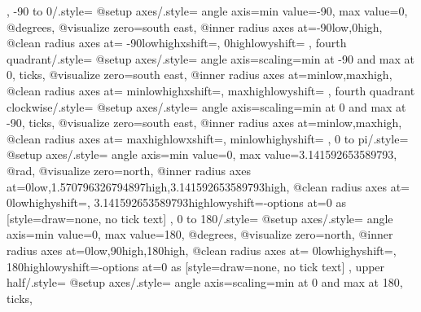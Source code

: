 {{{{      }
    }
  },
  -90 to 0/.style={
    @setup axes/.style={
      angle axis={min value=-90, max value=0},
      @degrees,
      @visualize zero=south east,
      @inner radius axes at={{-90}{low},{0}{high}},
      @clean radius axes at={%
        {-90}{low}{high}{xshift=}{},%
        {0}{high}{low}{yshift=}{}
      }
    }
  },
  fourth quadrant/.style={
    @setup axes/.style={
      angle axis={scaling=min at -90 and max at 0, ticks},
      @visualize zero=south east,
      @inner radius axes at={{min}{low},{max}{high}},
      @clean radius axes at={%
        {min}{low}{high}{xshift=}{},%
        {max}{high}{low}{yshift=}{}
      }
    }
  },
  fourth quadrant clockwise/.style={
    @setup axes/.style={
      angle axis={scaling=min at 0 and max at -90, ticks},
      @visualize zero=south east,
      @inner radius axes at={{min}{low},{max}{high}},
      @clean radius axes at={%
        {max}{high}{low}{xshift=}{},%
        {min}{low}{high}{yshift=}{}
      }
    }
  },
  0 to pi/.style={
    @setup axes/.style={
      angle axis={min value=0, max value=3.141592653589793},
      @rad,
      @visualize zero=north,
      @inner radius axes at={{0}{low},{1.570796326794897}{high},{3.141592653589793}{high}},
      @clean radius axes at={%
        {0}{low}{high}{yshift=}{},%
        {3.141592653589793}{high}{low}{yshift=-}{options at=0 as
          [{style={draw=none}, no tick text}]}
      }
    }
  },
  0 to 180/.style={
    @setup axes/.style={
      angle axis={min value=0, max value=180},
      @degrees,
      @visualize zero=north,
      @inner radius axes at={{0}{low},{90}{high},{180}{high}},
      @clean radius axes at={%
        {0}{low}{high}{yshift=}{},%
        {180}{high}{low}{yshift=-}{options at=0 as
          [{style={draw=none}, no tick text}]}
      }
    }
  },
  upper half/.style={
    @setup axes/.style={
      angle axis={scaling=min at 0 and max at 180, ticks},
}}}
